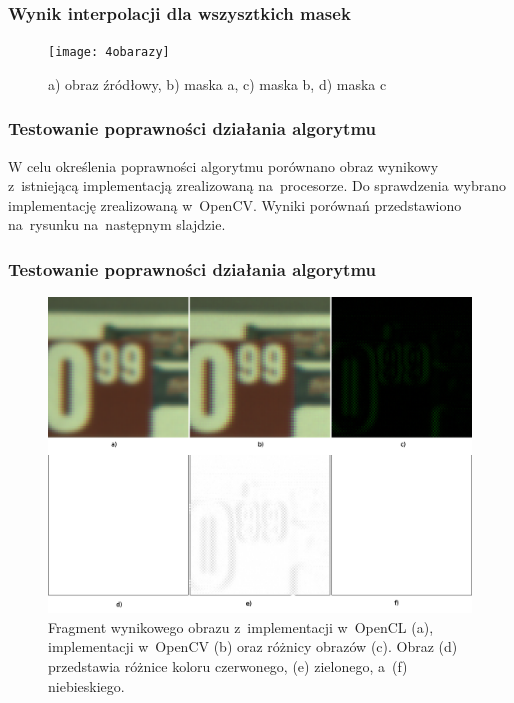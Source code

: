 \documentclass{beamer}
\begin{document}
\begin{frame}
  \frametitle{Wynik interpolacji dla wszysztkich masek}

\begin{figure}
  \centering
  \texttt{[image: 4obarazy]}
  \caption{a) obraz źródłowy, b) maska a, c) maska b, d) maska c}
  \label{fig:class_diagram}
\end{figure}

\end{frame}

\begin{frame}
  \frametitle{Testowanie poprawności działania algorytmu}

W celu określenia poprawności algorytmu porównano obraz wynikowy z~istniejącą implementacją zrealizowaną na~procesorze. Do sprawdzenia wybrano implementację zrealizowaną w~OpenCV. Wyniki porównań przedstawiono na~rysunku na~następnym slajdzie.

\end{frame}

\begin{frame}
  \frametitle{Testowanie poprawności działania algorytmu}
\begin{figure}
  \centering
  \includegraphics[width=0.55\linewidth]{result_diff}
  \caption{Fragment wynikowego obrazu z~implementacji w~OpenCL (a), implementacji w~OpenCV (b) oraz różnicy obrazów (c). Obraz (d) przedstawia różnice koloru czerwonego, (e) zielonego, a~(f) niebieskiego.}
  \label{fig:result_diff}
\end{figure}
\end{frame}
\end{document}
